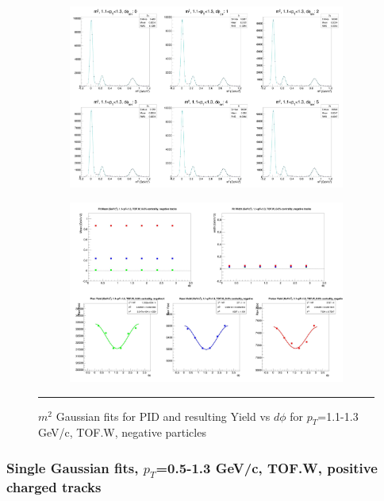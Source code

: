 \begin{figure}[H]
  \centering
    \begin{subfigure}[p]{1\textwidth}
    \includegraphics[width=1\textwidth]{lowptfits/yieldvsdphi_tof1_cent0_ch0_pT-11-13.jpg}
    \end{subfigure}
    \begin{subfigure}[p]{1\textwidth}
    \includegraphics[width=1\textwidth]{lowptfits/fitParams_tof1_cent0_ch0_pT-11-13.jpg}
    \end{subfigure}
    \rule{35em}{0.5pt}
  \caption[PID fits and Yield vs $d\phi$ for $p_T$=1.1-1.3 GeV/c, TOF.W, negative particles ]{$m^2$ Gaussian fits for PID and resulting Yield vs $d\phi$ for $p_T$=1.1-1.3 GeV/c, TOF.W, negative particles}
  \label{fig:fits11-13neg}
\end{figure}

\subsubsection{Single Gaussian fits, $p_T$=0.5-1.3 GeV/c, TOF.W, positive charged tracks}

